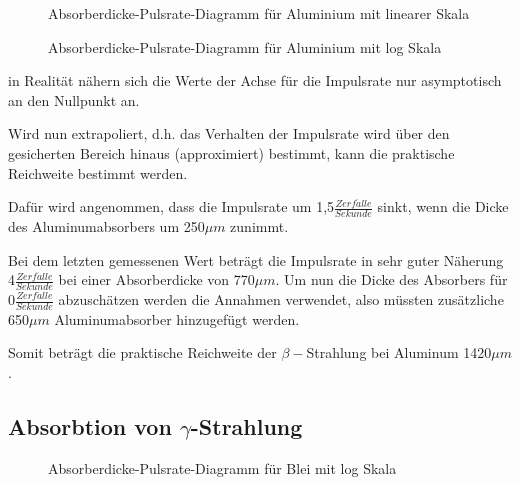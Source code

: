 \begin{figure}[h!]
\centering

\caption{Absorberdicke-Pulsrate-Diagramm für Aluminium mit linearer Skala}
\label{fig:alu_lin}
\end{figure}

\begin{figure}[h!]
\centering

\caption{Absorberdicke-Pulsrate-Diagramm für Aluminium mit log Skala}
\label{fig:alu_log}
\end{figure}

in Realität nähern sich die Werte der Achse für die Impulsrate nur
asymptotisch an den Nullpunkt an.

Wird nun extrapoliert, d.h. das Verhalten der Impulsrate wird über
den gesicherten Bereich hinaus (approximiert) bestimmt, kann die praktische
Reichweite bestimmt werden. 

Dafür wird angenommen, dass die Impulsrate um 1,5$\frac{Zerf\ddot{a}lle}{Sekunde}$
sinkt, wenn die Dicke des Aluminumabsorbers um 250$\mu m$ zunimmt. 

Bei dem letzten gemessenen Wert beträgt die Impulsrate in sehr guter
Näherung 4$\frac{Zerf\ddot{a}lle}{Sekunde}$ bei einer Absorberdicke
von 770$\mu m$. Um nun die Dicke des Absorbers für 0$\frac{Zerf\ddot{a}lle}{Sekunde}$
abzuschätzen werden die Annahmen verwendet, also müssten zusätzliche
650$\mu m$ Aluminumabsorber hinzugefügt werden.

Somit beträgt die praktische Reichweite der $\beta-$Strahlung bei
Aluminum 1420$\mu m$.

\subsection{Absorbtion von $ \gamma $-Strahlung}

\begin{figure}[h!]
\centering

\caption{Absorberdicke-Pulsrate-Diagramm für Blei mit log Skala}
\label{fig:pb_log}
\end{figure}